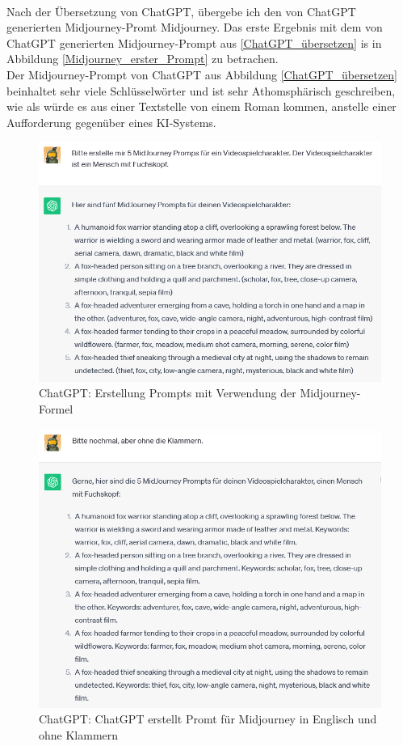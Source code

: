 \\
Nach der Übersetzung von ChatGPT, übergebe ich den von ChatGPT generierten Midjourney-Promt Midjourney. Das erste Ergebnis mit dem von ChatGPT generierten Midjourney-Prompt aus \ref{ChatGPT_übersetzen} is in Abbildung \ref{Midjourney_erster_Prompt} zu betrachen.
\\
Der Midjourney-Prompt von ChatGPT aus Abbildung \ref{ChatGPT_übersetzen} beinhaltet sehr viele Schlüsselwörter und ist sehr Athomsphärisch geschreiben, wie als würde es aus einer Textstelle von einem Roman kommen, anstelle einer Aufforderung gegenüber eines KI-Systems.
\begin{figure}[h]
	\centering
	\includegraphics[width=14cm]{BilderFuerBA/05.png}
	\caption{ChatGPT: Erstellung Prompts mit Verwendung der Midjourney-Formel}
	\label{chatgpt_mj-formel_mit_Klammern}
\end{figure}
\begin{figure}[h]
	\centering
	\includegraphics[scale=0.7]{BilderFuerBA/06.png}
	\caption{ChatGPT: ChatGPT erstellt Promt für Midjourney in Englisch und ohne Klammern}
	\label{chatgpt_mj-formel_ohne_Klammern}
\end{figure}
